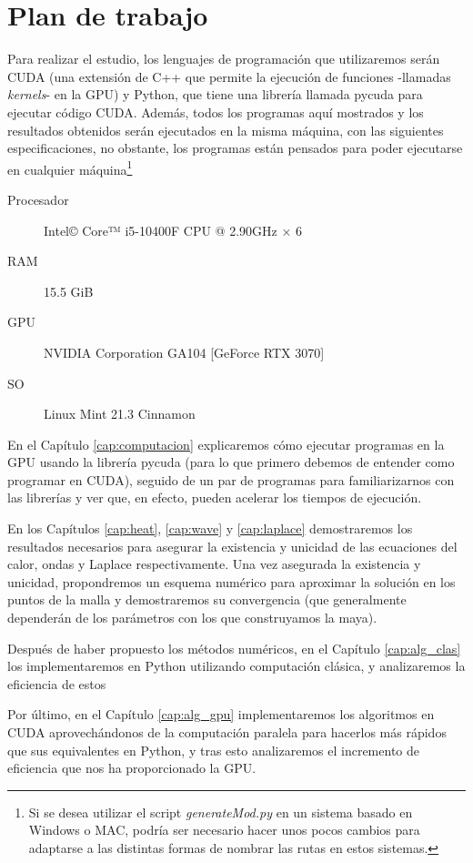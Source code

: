 \section{Plan de trabajo}
Para realizar el estudio, los lenguajes de programación que utilizaremos serán CUDA (una extensión de C++ que permite la ejecución de funciones -llamadas \emph{kernels}- en la \ac{GPU}) y Python, que tiene una librería llamada pycuda para ejecutar código \ac{CUDA}. Además, todos los programas aquí mostrados y los resultados obtenidos serán ejecutados en la misma máquina, con las siguientes especificaciones, no obstante, los programas están pensados para poder ejecutarse en cualquier máquina\footnote{Si se desea utilizar el script \textit{generateMod.py} en un sistema basado en Windows o MAC, podría ser necesario hacer unos pocos cambios para adaptarse a las distintas formas de nombrar las rutas en estos sistemas.}

\begin{description}
	\item[Procesador] Intel© Core™ i5-10400F CPU @ 2.90GHz × 6
	\item[RAM] 15.5 GiB
	\item[GPU] NVIDIA Corporation GA104 [GeForce RTX 3070]
	\item[SO] Linux Mint 21.3 Cinnamon
\end{description}

En el Capítulo \ref{cap:computacion} explicaremos cómo ejecutar programas en la \ac{GPU} usando la librería pycuda (para lo que primero debemos de entender como programar en CUDA), seguido de un par de programas para familiarizarnos con las librerías y ver que, en efecto, pueden acelerar los tiempos de ejecución.

En los Capítulos \ref{cap:heat}, \ref{cap:wave} y \ref{cap:laplace} demostraremos los resultados necesarios para asegurar la existencia y unicidad de las ecuaciones del calor, ondas y Laplace respectivamente. Una vez asegurada la existencia y unicidad, propondremos un esquema numérico para aproximar la solución en los puntos de la malla y demostraremos su convergencia (que generalmente dependerán de los parámetros con los que construyamos la maya).

Después de haber propuesto los métodos numéricos, en el Capítulo \ref{cap:alg_clas} los implementaremos en Python utilizando computación clásica, y analizaremos la eficiencia de estos

Por último, en el Capítulo \ref{cap:alg_gpu} implementaremos los algoritmos en CUDA aprovechándonos de la computación paralela para hacerlos más rápidos que sus equivalentes en Python, y tras esto analizaremos el incremento de eficiencia que nos ha proporcionado la GPU.
